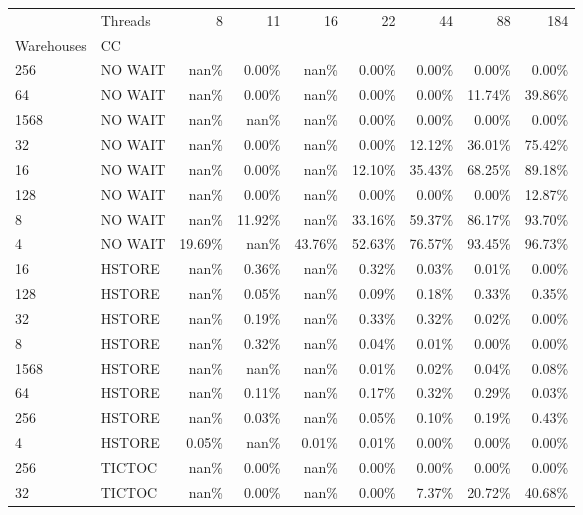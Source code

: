 \begin{tabular}{llrrrrrrr}
\toprule
     & Threads &    8   &    11  &    16  &    22  &    44  &    88  &    184 \\
Warehouses & CC &        &        &        &        &        &        &        \\
\midrule
256  & NO WAIT &   nan\% &  0.00\% &   nan\% &  0.00\% &  0.00\% &  0.00\% &  0.00\% \\
64   & NO WAIT &   nan\% &  0.00\% &   nan\% &  0.00\% &  0.00\% & 11.74\% & 39.86\% \\
1568 & NO WAIT &   nan\% &   nan\% &   nan\% &  0.00\% &  0.00\% &  0.00\% &  0.00\% \\
32   & NO WAIT &   nan\% &  0.00\% &   nan\% &  0.00\% & 12.12\% & 36.01\% & 75.42\% \\
16   & NO WAIT &   nan\% &  0.00\% &   nan\% & 12.10\% & 35.43\% & 68.25\% & 89.18\% \\
128  & NO WAIT &   nan\% &  0.00\% &   nan\% &  0.00\% &  0.00\% &  0.00\% & 12.87\% \\
8    & NO WAIT &   nan\% & 11.92\% &   nan\% & 33.16\% & 59.37\% & 86.17\% & 93.70\% \\
4    & NO WAIT & 19.69\% &   nan\% & 43.76\% & 52.63\% & 76.57\% & 93.45\% & 96.73\% \\
16   & HSTORE &   nan\% &  0.36\% &   nan\% &  0.32\% &  0.03\% &  0.01\% &  0.00\% \\
128  & HSTORE &   nan\% &  0.05\% &   nan\% &  0.09\% &  0.18\% &  0.33\% &  0.35\% \\
32   & HSTORE &   nan\% &  0.19\% &   nan\% &  0.33\% &  0.32\% &  0.02\% &  0.00\% \\
8    & HSTORE &   nan\% &  0.32\% &   nan\% &  0.04\% &  0.01\% &  0.00\% &  0.00\% \\
1568 & HSTORE &   nan\% &   nan\% &   nan\% &  0.01\% &  0.02\% &  0.04\% &  0.08\% \\
64   & HSTORE &   nan\% &  0.11\% &   nan\% &  0.17\% &  0.32\% &  0.29\% &  0.03\% \\
256  & HSTORE &   nan\% &  0.03\% &   nan\% &  0.05\% &  0.10\% &  0.19\% &  0.43\% \\
4    & HSTORE &  0.05\% &   nan\% &  0.01\% &  0.01\% &  0.00\% &  0.00\% &  0.00\% \\
256  & TICTOC &   nan\% &  0.00\% &   nan\% &  0.00\% &  0.00\% &  0.00\% &  0.00\% \\
32   & TICTOC &   nan\% &  0.00\% &   nan\% &  0.00\% &  7.37\% & 20.72\% & 40.68\% \\

\end{tabular}
